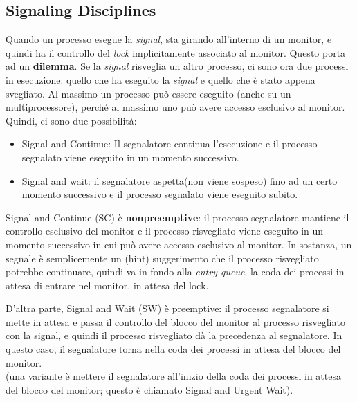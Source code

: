 \documentclass[10pt,a4paper]{book}
\begin{document}
\subsection{Signaling Disciplines}
Quando un processo esegue la \textit{signal}, sta girando all'interno di un monitor, e quindi ha il controllo del \textit{lock} implicitamente associato al monitor. Questo porta ad un \textbf{dilemma}. Se la \textit{signal} risveglia un altro processo, ci sono ora due processi in esecuzione: quello che ha eseguito la \textit{signal} e quello che è stato appena svegliato. Al massimo un processo può essere eseguito (anche su un multiprocessore), perché al massimo uno può avere accesso esclusivo al monitor. Quindi, ci sono due possibilità:
\begin{itemize}
\item Signal and Continue: Il segnalatore continua l'esecuzione e il processo segnalato viene eseguito in un momento successivo.
\item Signal and wait: il segnalatore aspetta(non viene sospeso) fino ad un certo momento successivo e il processo segnalato viene eseguito subito.
\end{itemize}

Signal and Continue (SC) è \textbf{nonpreemptive}: il processo segnalatore mantiene il controllo esclusivo del monitor e il processo risvegliato viene eseguito in un momento successivo in cui può avere accesso esclusivo al monitor. In sostanza, un segnale è semplicemente un (hint) suggerimento che il processo risvegliato potrebbe continuare, quindi va in fondo alla \textit{entry queue}, la coda dei processi in attesa di entrare nel monitor, in attesa del lock.

D'altra parte, Signal and Wait (SW) è preemptive: il processo segnalatore si mette in attesa e passa il controllo del blocco del monitor al processo risvegliato con la signal, e quindi il processo risvegliato dà la precedenza al segnalatore. In questo caso, il segnalatore torna nella coda dei processi in attesa del blocco del monitor.\\ (una variante è mettere il segnalatore all'inizio della coda dei processi in attesa del blocco del monitor; questo è chiamato Signal and Urgent Wait).\\ \\ \\
\end{document}
